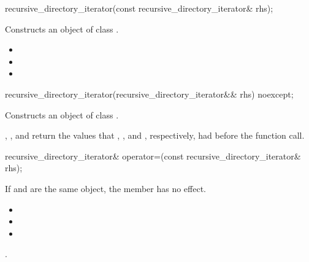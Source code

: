 %
\begin{itemdecl}
recursive_directory_iterator(const recursive_directory_iterator& rhs);
\end{itemdecl}

\begin{itemdescr}
\pnum
\effects Constructs an object of class .

\pnum
\postconditions
\begin{itemize}
\item {}
\item {}
\item {}
\end{itemize}
\end{itemdescr}

%
\begin{itemdecl}
recursive_directory_iterator(recursive_directory_iterator&& rhs) noexcept;
\end{itemdecl}

\begin{itemdescr}
\pnum
\effects Constructs an object of class .

\pnum
\postconditions {}, ,
  and  return the values that
  , , and
  , respectively, had before the function call.
\end{itemdescr}

%
\begin{itemdecl}
recursive_directory_iterator& operator=(const recursive_directory_iterator& rhs);
\end{itemdecl}

\begin{itemdescr}
\pnum
\effects If  and  are the same
  object, the member has no effect.

\pnum
\postconditions
\begin{itemize}
\item {}
\item {}
\item {}
\end{itemize}

\pnum
\returns {}.
\end{itemdescr}

